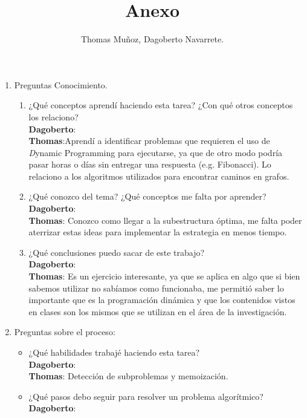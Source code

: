 \documentclass{udparticle}
\title{Anexo}
\author{Thomas Muñoz, Dagoberto Navarrete.}
\begin{document}
\maketitle
\begin{enumerate}
    \item Preguntas Conocimiento.\\
        \begin{enumerate}
            \item ¿Qué conceptos aprendí haciendo esta tarea? ¿Con qué otros conceptos los relaciono? \\
                {\bf Dagoberto}:\\
                {\bf Thomas}:Aprendí a identificar problemas que requieren el uso de {\textit Dynamic Programming} para ejecutarse, ya que de otro modo podría pasar horas o días sin entregar una respuesta (e.g. Fibonacci). Lo relaciono a los algoritmos utilizados para encontrar caminos en grafos.
            \item ¿Qué conozco del tema? ¿Qué conceptos me falta por aprender?\\
                {\bf Dagoberto}: \\
                {\bf Thomas}: Conozco como llegar a la subestructura óptima, me falta poder aterrizar estas ideas para implementar la estrategia en menos tiempo.
            \item ¿Qué conclusiones puedo sacar de este trabajo?\\
                {\bf Dagoberto}:\\
                {\bf Thomas}: Es un ejercicio interesante, ya que se aplica en algo que si bien sabemos utilizar no sabíamos como funcionaba, me permitió saber lo importante que es la programación dinámica y que los contenidos vistos en clases son los mismos que se utilizan en el área de la investigación.
        \end{enumerate}
    \item Preguntas sobre el proceso:\\
        \begin{itemize}
            \item ¿Qué habilidades trabajé haciendo esta tarea?\\
                {\bf Dagoberto}:\\
                {\bf Thomas}: Detección de subproblemas y memoización.
            \item ¿Qué pasos debo seguir para resolver un problema algorítmico?\\
                {\bf Dagoberto}: \\

\end{itemize}
\end{enumerate}
\end{document}
